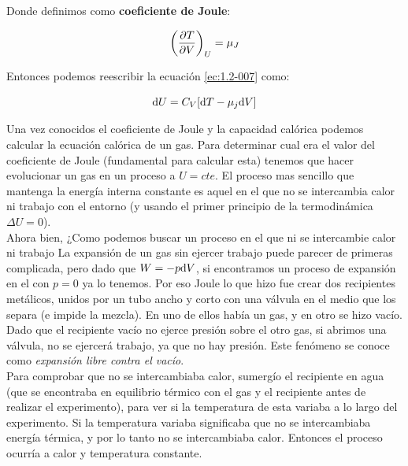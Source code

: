 \documentclass[12pt,a4paper]{article}
\begin{document}
Donde definimos como \textbf{coeficiente de Joule}:

\begin{equation}
\left( \frac{\partial T}{\partial V} \right)_U  = \mu_J
\end{equation} 

Entonces podemos reescribir la ecuación \ref{ec:1.2-007} como:

\begin{equation}
\mathrm{d} U = C_V [ \mathrm{d} T - \mu_j \mathrm{d} V]
\end{equation}

Una vez conocidos el coeficiente de Joule y la capacidad calórica podemos calcular la ecuación calórica de un gas. Para determinar cual era el valor del coeficiente de Joule (fundamental para calcular esta) tenemos que hacer evolucionar un gas en un proceso a $U=cte$. El proceso mas sencillo que mantenga la energía interna constante es aquel en el que no se intercambia calor ni trabajo con el entorno (y usando el primer principio de la termodinámica $\Delta U = 0$). \\

Ahora bien, ¿Como podemos buscar un proceso en el que ni se intercambie calor ni trabajo La expansión de un gas sin ejercer trabajo puede parecer de primeras complicada, pero dado que $W=-p \mathrm{d} V$, si encontramos un proceso de expansión en el con $p=0$ ya lo tenemos. Por eso Joule lo que hizo fue crear dos recipientes metálicos, unidos por un tubo ancho y corto con una válvula en el medio que los separa (e impide la mezcla). En uno de ellos había un gas, y en otro se hizo vacío. Dado que el recipiente vacío no ejerce presión sobre el otro gas, si abrimos una válvula, no se ejercerá trabajo, ya que no hay presión. Este fenómeno se conoce como \textit{expansión libre contra el vacío}. \\

Para comprobar que no se intercambiaba calor, sumergío el recipiente en agua (que se encontraba en equilibrio térmico con el gas y el recipiente antes de realizar el experimento), para ver si la temperatura de esta variaba a lo largo del experimento. Si la temperatura variaba significaba que no se intercambiaba energía térmica, y por lo tanto no se intercambiaba calor. Entonces el proceso ocurría a calor y temperatura constante.
\end{document}
